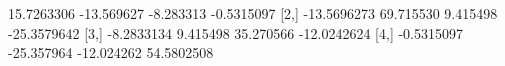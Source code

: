 \begin{Schunk}
\begin{Soutput}
            [,1]       [,2]       [,3]        [,4]
[1,]  15.7263306 -13.569627  -8.283313  -0.5315097
[2,] -13.5696273  69.715530   9.415498 -25.3579642
[3,]  -8.2833134   9.415498  35.270566 -12.0242624
[4,]  -0.5315097 -25.357964 -12.024262  54.5802508
\end{Soutput}
\end{Schunk}
